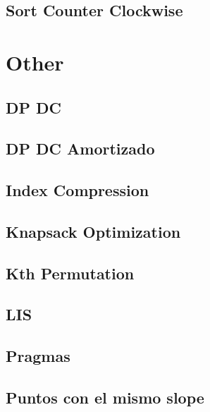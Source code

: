 \subsection{	Sort Counter Clockwise}
\raggedbottom
\hrulefill

\section{Other}
\subsection{	DP DC}
\raggedbottom
\hrulefill
\subsection{	DP DC Amortizado}
\raggedbottom
\hrulefill
\subsection{	Index Compression}
\raggedbottom
\hrulefill
\subsection{	Knapsack Optimization}
\raggedbottom
\hrulefill
\subsection{	Kth Permutation}
\raggedbottom
\hrulefill
\subsection{	LIS}
\raggedbottom
\hrulefill
\subsection{	Pragmas}
\raggedbottom
\hrulefill
\subsection{	Puntos con el mismo slope}
\raggedbottom
\hrulefill

